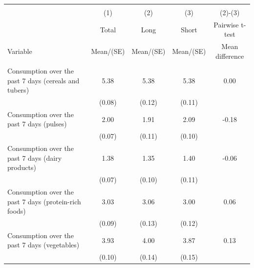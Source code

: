 
\begin{tabular}{@{\extracolsep{5pt}}lcccc}
\\[-1.8ex]\hline \hline \\[-1.8ex]
 & \multicolumn{1}{c}{(1)}  & \multicolumn{1}{c}{(2)}  & \multicolumn{1}{c}{(3)}  & \multicolumn{1}{c}{(2)-(3)} \\
 & \multicolumn{1}{c}{Total}  & \multicolumn{1}{c}{Long}  & \multicolumn{1}{c}{Short}  & \multicolumn{1}{c}{Pairwise t-test}  \\
Variable & Mean/(SE) & Mean/(SE) & Mean/(SE) & Mean difference \\ \hline \\[-1.8ex] 
Consumption over the past 7 days (cereals and tubers)   & 5.38    & 5.38    & 5.38    & 0.00   \\
 & (0.08)  & (0.12)  & (0.11)  &  \\ [1ex]
Consumption over the past 7 days (pulses)   & 2.00    & 1.91    & 2.09    & -0.18   \\
 & (0.07)  & (0.11)  & (0.10)  &  \\ [1ex]
Consumption over the past 7 days (dairy products)   & 1.38    & 1.35    & 1.40    & -0.06   \\
 & (0.07)  & (0.10)  & (0.11)  &  \\ [1ex]
Consumption over the past 7 days (protein-rich foods)   & 3.03    & 3.06    & 3.00    & 0.06   \\
 & (0.09)  & (0.13)  & (0.12)  &  \\ [1ex]
Consumption over the past 7 days (vegetables)   & 3.93    & 4.00    & 3.87    & 0.13   \\
 & (0.10)  & (0.14)  & (0.15)  &  \\ [1ex]

\end{tabular}
